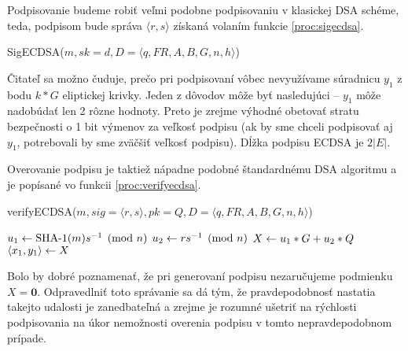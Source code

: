 Podpisovanie budeme robiť veľmi podobne podpisovaniu v klasickej DSA
schéme, teda, podpisom bude správa $\langle r,s \rangle$ získaná 
volaním funkcie \ref{proc:sigecdsa}.

\begin{procedure}[!h]
    \caption{SigECDSA($m,sk=d, D=\langle q,FR, A,B,G,n,h \rangle$)}
    \label{proc:sigecdsa}
    \;
\end{procedure}

Čitateľ sa možno čuduje, prečo pri podpisovaní vôbec nevyužívame
súradnicu $y_1$ z bodu $k*G$ eliptickej krivky. Jeden z dôvodov môže
byť nasledujúci -- $y_1$ môže nadobúdať len 2 rôzne hodnoty. Preto
je zrejme výhodné obetovať stratu bezpečnosti o 1 bit výmenov za veľkosť
podpisu (ak by sme chceli podpisovať aj $y_1$, potrebovali by sme
zväčšiť veľkosť podpisu). Dĺžka podpisu ECDSA je $2|E|$.

Overovanie podpisu je taktiež nápadne podobné štandardnému DSA
algoritmu a je popísané vo funkcii \ref{proc:verifyecdsa}.

\begin{procedure}[!h]
    \caption{verifyECDSA($m,sig=\langle r,s \rangle,pk= Q,
            D=\langle q,FR, A,B,G,n,h \rangle$)}
    \label{proc:verifyecdsa}
    \;
    $u_1 \leftarrow \mbox{SHA-1}(m) s^{-1}\pmod{n}$ \;
    $u_2 \leftarrow r s^{-1} \pmod{n}$ \;
    $X \leftarrow u_1 * G + u_2 * Q$ \;
    $ \langle x_1, y_1 \rangle \leftarrow X$ \;
\end{procedure}

Bolo by dobré poznamenať, že pri generovaní podpisu nezaručujeme
podmienku $X=\mathbf{0}$. Odpravedlniť toto správanie sa dá tým, že
pravdepodobnosť nastatia takejto udalosti je zanedbateľná a zrejme
je rozumné ušetriť na rýchlosti podpisovania
na úkor nemožnosti overenia podpisu v tomto nepravdepodobnom prípade.

